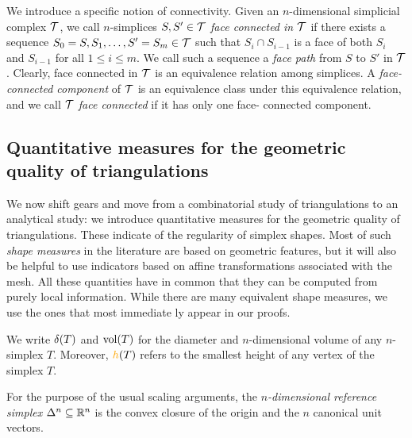 \documentclass[10pt,letterpaper]{article}
\newcommand\cye[1]{%
  \protect\leavevmode
  \begingroup
    \color{red!35!yellow}%
    #1%
  \endgroup
}
\begin{document}
We introduce a specific notion of connectivity. 
Given an $n$-dimensional simplicial complex ${\mathcal T}$, 
we call $n$-simplices $S,S' \in {\mathcal T}$ \emph{\cye{face} connected in ${\mathcal T}$} if there exists a sequence $S_0=S,S_1,\dots,S'=S_m \in {\mathcal T}$ such that $S_{i} \cap S_{i-1}$ is a face of both $S_{i}$ and $S_{i-1}$ for all $1 \leq i \leq m$. %
We call such a sequence a \emph{\cye{face} path} from $S$ to $S'$ in ${\mathcal T}$. 
Clearly, \cye{face} connected in ${\mathcal T}$ is an equivalence relation among simplices. 
A \emph{\cye{face-}connected component} of ${\mathcal T}$ is an equivalence class under this equivalence relation, 
and we call ${\mathcal T}$ \emph{\cye{face} connected} if it has only one \cye{face-}connected component. 

\subsection{\cye{Quantitative measures for the geometric quality of triangulations}} \label{section:qual_triang}


We \cye{now} shift gears and move from a combinatorial study of triangulations to an analytical study:
we introduce quantitative measures for the geometric quality of triangulations. 
These indicate of the regularity of simplex shapes. 
Most of such \emph{shape measures} in the literature are based on geometric features, 
but it will also be helpful to use indicators based on affine transformations associated with the mesh. %
All these quantities have in common that they can be computed from purely local information. 
While there are many equivalent shape measures, we use the ones that most immediate\cye{ly} appear in our proofs.


We write ${\delta}(T)$ and $\operatorname{vol}(T)$ for the diameter and $n$-dimensional volume of any $n$-simplex $T$.
Moreover, $\height(T)$ refers to the smallest height of any vertex of the simplex $T$.

For the purpose of the usual scaling arguments, the \emph{$n$-dimensional reference simplex} $\Delta^n \subseteq {\mathbb R}^n$ is the convex closure of the origin and the $n$ canonical unit vectors. 
\end{document}
